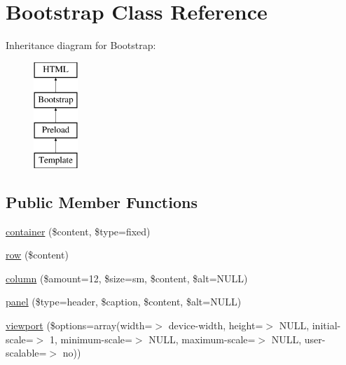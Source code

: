 \hypertarget{class_w_a_f_f_l_e_1_1_framework_1_1_engines_1_1_bootstrap}{}\section{Bootstrap Class Reference}
\label{class_w_a_f_f_l_e_1_1_framework_1_1_engines_1_1_bootstrap}
Inheritance diagram for Bootstrap\+:\begin{figure}[H]
\begin{center}
\leavevmode
\includegraphics[height=4.000000cm]{class_w_a_f_f_l_e_1_1_framework_1_1_engines_1_1_bootstrap}
\end{center}
\end{figure}
\subsection*{Public Member Functions}
\begin{DoxyCompactItemize}
\item 
\hyperlink{class_w_a_f_f_l_e_1_1_framework_1_1_engines_1_1_bootstrap_a9ec86a4d6d518a85ed36db4f23ea2bfa}{container} (\$content, \$type=\textquotesingle{}fixed\textquotesingle{})
\item 
\hyperlink{class_w_a_f_f_l_e_1_1_framework_1_1_engines_1_1_bootstrap_a65e72e655a53b204edaaef347ad39799}{row} (\$content)
\item 
\hyperlink{class_w_a_f_f_l_e_1_1_framework_1_1_engines_1_1_bootstrap_a96d284570acb2b50b7e934af06d25c8e}{column} (\$amount=12, \$size=\textquotesingle{}sm\textquotesingle{}, \$content, \$alt=N\+U\+LL)
\item 
\hyperlink{class_w_a_f_f_l_e_1_1_framework_1_1_engines_1_1_bootstrap_ac9f62997b8f02752fd592c9a831c55af}{panel} (\$type=\textquotesingle{}header\textquotesingle{}, \$caption, \$content, \$alt=N\+U\+LL)
\item 
\hyperlink{class_w_a_f_f_l_e_1_1_framework_1_1_engines_1_1_bootstrap_a760d6816b7e769fe6915845ea3d77cdd}{viewport} (\$options=array(\textquotesingle{}width\textquotesingle{}=$>$ \textquotesingle{}device-\/width\textquotesingle{}, \textquotesingle{}height\textquotesingle{}=$>$ N\+U\+LL, \textquotesingle{}initial-\/scale\textquotesingle{}=$>$ 1, \textquotesingle{}minimum-\/scale\textquotesingle{}=$>$ N\+U\+LL, \textquotesingle{}maximum-\/scale\textquotesingle{}=$>$ N\+U\+LL, \textquotesingle{}user-\/scalable\textquotesingle{}=$>$ \textquotesingle{}no\textquotesingle{}))
\end{DoxyCompactItemize}


